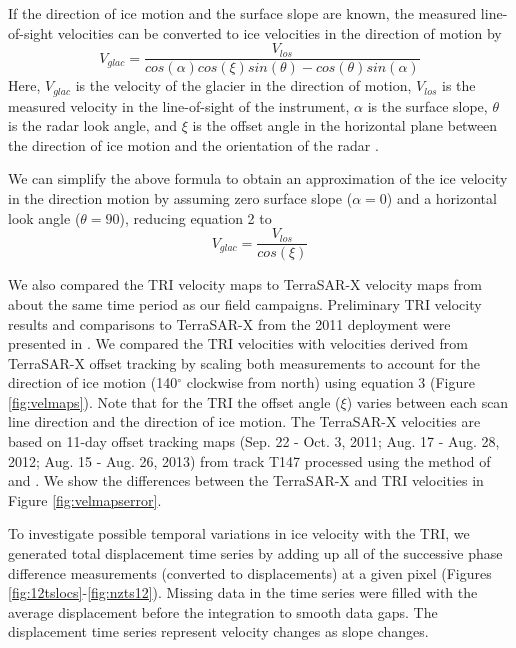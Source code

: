 If the direction of ice motion and the surface slope are known, the measured line-of-sight velocities can be converted to ice velocities in the direction of motion by 
  \begin{equation} V_{glac}=\frac{V_{los}}{cos(\alpha)cos(\xi)sin(\theta)-cos(\theta)sin(\alpha)}\end{equation} 
Here, $V_{glac}$ is the velocity of the glacier in the direction of motion, $V_{los}$ is the measured velocity in the line-of-sight of the instrument, $\alpha$ is the surface slope, $\theta$ is the radar look angle, and $\xi$ is the offset angle in the horizontal plane between the direction of ice motion and the orientation of the radar \citep{kwokandfahnestock}.

We can simplify the above formula to obtain an approximation of the ice velocity in the direction motion by assuming zero surface slope ($\alpha=0$) and a horizontal look angle ($\theta=90$), reducing equation 2 to 
\begin{equation}  
  V_{glac}=\frac{V_{los}}{cos(\xi)}
\end{equation} 
 
 
We also compared the TRI velocity maps to TerraSAR-X velocity maps from about the same time period as our field campaigns. Preliminary TRI
velocity results and comparisons to TerraSAR-X from the 2011 deployment were presented in \citet{voytenko2012monitoring}.
We compared the TRI velocities with velocities derived from TerraSAR-X offset tracking by scaling both measurements to account for the direction of ice motion (140$^{\circ}$ clockwise from north) using equation 3 (Figure \ref{fig:velmaps}). Note that for the TRI the offset angle ($\xi$) varies between each scan line direction and the direction of ice motion. The TerraSAR-X velocities are based on 11-day offset tracking maps (Sep. 22 - Oct. 3, 2011; Aug. 17 - Aug. 28, 2012; Aug. 15 - Aug. 26, 2013) from track T147 processed using the method of \citet{strozzi2002glacier} and \citet{ paul2013glaciers}. We show the differences between the TerraSAR-X and TRI velocities in Figure \ref{fig:velmapserror}.

  
To investigate possible temporal variations in ice velocity with the TRI, we generated total displacement time series by adding up all of the successive phase difference measurements (converted to displacements) at a given pixel (Figures \ref{fig:12tslocs}-\ref{fig:nzts12}). Missing data in the time series were filled with the average displacement before the integration to smooth data gaps. The displacement time series represent velocity changes as slope changes.

